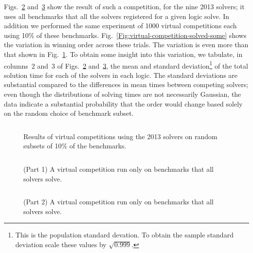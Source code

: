 \documentclass[smallcondensed]{svjour3}
\begin{document}
Figs.~\ref{Fig:virtual-competition-solved} and~\ref{Fig:virtual-competition-solved2} show the result of such a competition, for the nine 2013 solvers; it uses all benchmarks that all the solvers registered for a given logic solve. In addition we performed the same experiment of 1000 virtual competitions each using 10\% of these benchmarks.  Fig.~\ref{Fig:virtual-competition-solved-some} shows the variation in winning order across these trials. The variation is even more than that shown in Fig.~\ref{Fig:virtual-competition-some}. To obtain some insight into this variation, we tabulate, in columns~2 and~3 of Figs.~\ref{Fig:virtual-competition-solved} and~\ref{Fig:virtual-competition-solved2}, the mean and standard deviation\footnote{This is the population standard devation. To obtain the sample standard deviation scale these values by $\sqrt{0.999}$.} of the total solution time for each of the solvers in each logic. The standard deviations are substantial compared to the differences in mean times between competing solvers; even though the distributions of solving times are not necessarily Gaussian, the data indicate a substantial probability that the order would change based solely on the random choice of benchmark subset.

\begin{figure}
\centering
\begin{tabular}{|lrr|rr|r|}
\hline

\end{tabular}
\caption{Results of virtual competitions using the 2013 solvers on random subsets of 10\% of the benchmarks.}
\label{Fig:virtual-competition-some}
\end{figure}

\begin{figure}
\centering
\begin{tabular}{|p{.01in}rrrl|}
\hline

\end{tabular}
\caption{(Part 1) A virtual competition run only on benchmarks that all solvers solve.}
\label{Fig:virtual-competition-solved}
\end{figure}

\begin{figure}
\centering
\begin{tabular}{|p{.01in}rrrl|}
\hline

\end{tabular}
\caption{(Part 2) A virtual competition run only on benchmarks that all solvers solve.}
\label{Fig:virtual-competition-solved2}
\end{figure}
\end{document}
